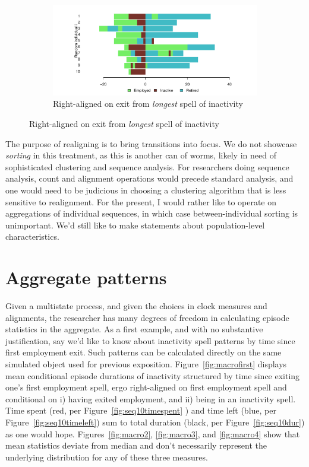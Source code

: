 \documentclass{article}
\begin{document}
\begin{figure}[ht!]
\begin{subfigure}{\textwidth}
\centering
\caption{Right-aligned on exit from \emph{longest} spell of inactivity}
\label{fig:longinactright}
\includegraphics[scale=.5]{Figures/Seq10inactlongright.pdf}
\end{subfigure}

\end{figure}

The purpose of realigning is to bring transitions into focus. We do not showcase
\emph{sorting} in this treatment, as this is another can of worms, likely in
need of sophisticated clustering and sequence analysis. For researchers doing
sequence analysis, count and alignment operations would precede standard
analysis, and one would need to be judicious in choosing a clustering algorithm
that is less sensitive to realignment. For the present, I would rather
like to operate on aggregations of individual sequences, in which case between-individual sorting is unimportant. We'd still like to make statements about population-level characteristics.

\FloatBarrier
\section{Aggregate patterns}
Given a multistate process, and given the choices in clock measures and
alignments, the researcher has many degrees of freedom in calculating episode
statistics in the aggregate. As a first example, and with no substantive
justification, say we'd like to know about inactivity spell patterns by time
since first employment exit. Such patterns can be calculated directly on the
same simulated object used for previous exposition.
Figure~\ref{fig:macrofirst} displays mean conditional episode durations of
inactivity structured by time since exiting one's first employment spell, ergo
right-aligned on first employment spell and conditional on i) having exited
employment, and ii) being in an inactivity spell. Time spent (red, per
Figure~\ref{fig:seq10timespent} ) and time left (blue, per
Figure~\ref{fig:seq10timeleft}) sum to total duration
(black, per
Figure~\ref{fig:seq10dur}) as one would hope.
Figures~\ref{fig:macro2}, \ref{fig:macro3}, and \ref{fig:macro4} show that mean
statistics deviate from median and don't necessarily represent the underlying
distribution for any of these three measures. 
\end{document}
